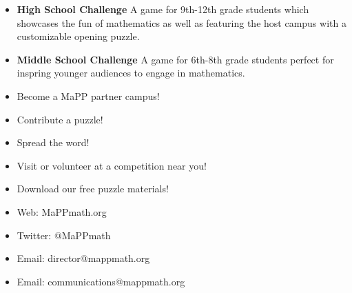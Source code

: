 \documentclass{puzzlehunt}
\begin{document}

\begin{itemize}
\item \textbf{High School Challenge}\newline
A game for 9th-12th grade students which showcases the fun of mathematics
as well as featuring the host campus with a customizable opening puzzle.

\item \textbf{Middle School Challenge}\newline
A game for 6th-8th grade students perfect for inspring younger audiences to
engage in mathematics.
\end{itemize}

\vspace{0.8em}

\begin{multicols}{2}

  \begin{itemize}
  \item Become a MaPP partner campus!
  \item Contribute a puzzle!
  \item Spread the word!
  \item Visit or volunteer at a competition near you!
  \item Download our free puzzle materials!
  \end{itemize}

  \columnbreak


  \begin{itemize}
  \item Web: MaPPmath.org
  \item Twitter: @MaPPmath
  \item Email: director@mappmath.org
  \item Email: communications@mappmath.org
  \end{itemize}
\end{multicols}
\end{document}
